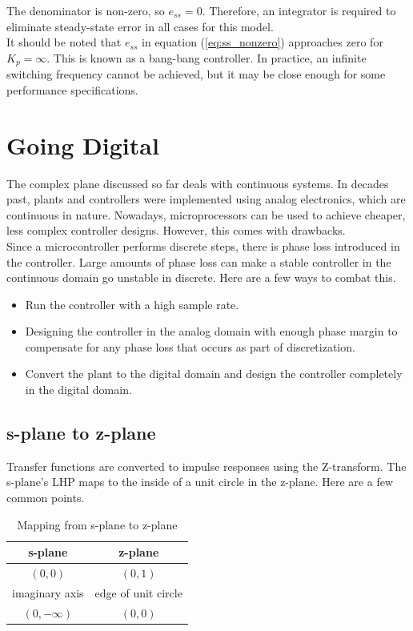 \documentclass[10pt,conference,compsoc]{IEEEtran}
\begin{document}
The denominator is non-zero, so $e_{ss} = 0$. Therefore, an integrator is
required to eliminate \gls{steady-state error} in all cases for this model. \\

It should be noted that $e_{ss}$ in equation (\ref{eq:ss_nonzero}) approaches
zero for $K_p = \infty$. This is known as a bang-bang controller. In practice,
an infinite switching frequency cannot be achieved, but it may be close enough
for some performance specifications.

\section{Going Digital}

The complex plane discussed so far deals with continuous \glspl{system}. In
decades past, \glspl{plant} and controllers were implemented using analog
electronics, which are continuous in nature. Nowadays, microprocessors can be
used to achieve cheaper, less complex controller designs. However, this comes
with drawbacks. \\

Since a microcontroller performs discrete steps, there is phase loss introduced
in the controller. Large amounts of phase loss can make a stable controller in
the continuous domain go unstable in discrete. Here are a few ways to combat
this.

\begin{itemize}
  \item Run the controller with a high sample rate.
  \item Designing the controller in the analog domain with enough phase margin
    to compensate for any phase loss that occurs as part of discretization.
  \item Convert the \gls{plant} to the digital domain and design the controller
    completely in the digital domain.
\end{itemize}

\subsection{s-plane to z-plane}

Transfer functions are converted to impulse responses using the Z-transform. The
s-plane's LHP maps to the inside of a unit circle in the z-plane. Here are a few
common points.

\begin{table}[ht]
  \caption{Mapping from s-plane to z-plane}
  \renewcommand{\arraystretch}{1.3}
  \centering
  \begin{tabular}{|cc|}
    \hline
    \textbf{s-plane} & \textbf{z-plane} \\
    \hline
    $(0, 0)$ & $(0, 1)$ \\
    imaginary axis & edge of unit circle \\
    $(0, -\infty)$ & $(0, 0)$ \\
    \hline
  \end{tabular}
  \label{tab:s-plane2z-plane}
\end{table}
\end{document}

